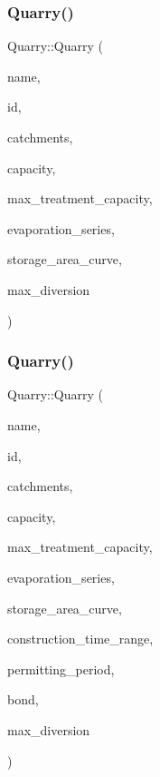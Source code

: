 \subsubsection{\texorpdfstring{Quarry()}{Quarry()}\hspace{0.1cm}{\footnotesize\ttfamily [1/5]}}
{\footnotesize\ttfamily Quarry\+::\+Quarry (\begin{DoxyParamCaption}\item[{const char $\ast$}]{name,  }\item[{const int}]{id,  }\item[{const vector$<$ \mbox{\hyperlink{classCatchment}{Catchment}} $\ast$$>$ \&}]{catchments,  }\item[{const double}]{capacity,  }\item[{const double}]{max\+\_\+treatment\+\_\+capacity,  }\item[{\mbox{\hyperlink{classEvaporationSeries}{Evaporation\+Series}} \&}]{evaporation\+\_\+series,  }\item[{\mbox{\hyperlink{classDataSeries}{Data\+Series}} $\ast$}]{storage\+\_\+area\+\_\+curve,  }\item[{double}]{max\+\_\+diversion }\end{DoxyParamCaption})}

\mbox{\label{classQuarry_a13cc1caeda6846900893f8d24c49b111}} 
\subsubsection{\texorpdfstring{Quarry()}{Quarry()}\hspace{0.1cm}{\footnotesize\ttfamily [2/5]}}
{\footnotesize\ttfamily Quarry\+::\+Quarry (\begin{DoxyParamCaption}\item[{const char $\ast$}]{name,  }\item[{const int}]{id,  }\item[{const vector$<$ \mbox{\hyperlink{classCatchment}{Catchment}} $\ast$$>$ \&}]{catchments,  }\item[{const double}]{capacity,  }\item[{const double}]{max\+\_\+treatment\+\_\+capacity,  }\item[{\mbox{\hyperlink{classEvaporationSeries}{Evaporation\+Series}} \&}]{evaporation\+\_\+series,  }\item[{\mbox{\hyperlink{classDataSeries}{Data\+Series}} $\ast$}]{storage\+\_\+area\+\_\+curve,  }\item[{const vector$<$ double $>$ \&}]{construction\+\_\+time\+\_\+range,  }\item[{double}]{permitting\+\_\+period,  }\item[{\mbox{\hyperlink{classBond}{Bond}} \&}]{bond,  }\item[{double}]{max\+\_\+diversion }\end{DoxyParamCaption})}

